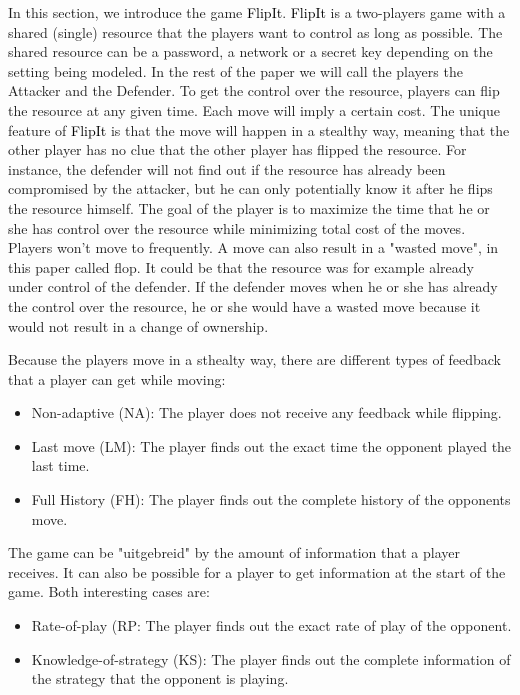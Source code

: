 \documentclass[a4paper, 11pt]{article}
\newcommand{\flip}[1] {\textcolor{black}{#1}}
\begin{document}
In this section, we introduce the game \flip{FlipIt}. \flip{FlipIt} is a two-players game with a shared (single) resource that the players want to control as long as possible. The shared resource can be a password, a network or a secret key depending on the setting being modeled. In the rest of the paper we will call the players the Attacker and the Defender. To get the control over the resource, players can flip the resource at any given time. Each move will imply a certain cost. The unique feature of \flip{FlipIt} is that the move will happen in a stealthy way, meaning that the other player has no clue that the other player has flipped the resource. For instance, the defender will not find out if the resource has already been compromised by the attacker, but he can only potentially know it after he flips the resource himself. The goal of the player is to maximize the time that he or she has control over the resource while minimizing total cost of the moves. Players won't move to frequently. A move can also result in a "wasted move", in this paper called flop. It could be that the resource was for example already under control of the defender. If the defender moves when he or she has already the control over the resource, he or she would have a wasted move because it would not result in a change of ownership. 
 
Because the players move in a sthealty way, there are different types of feedback that a player can get while moving:
\begin{itemize}
\item Non-adaptive (NA): The player does not receive any feedback while flipping.
\item Last move (LM): The player finds out the exact time the opponent played the last time.
\item Full History (FH): The player finds out the complete history of the opponents move.
\end{itemize}
The game can be "uitgebreid" by the amount of information that a player receives. It can also be possible for a player to get information at the start of the game. Both interesting cases are:
\begin{itemize}
\item Rate-of-play (RP: The player finds out the exact rate of play of the opponent.
\item Knowledge-of-strategy (KS): The player finds out the complete information of the strategy that the opponent is playing.
\end{itemize}
\end{document}
